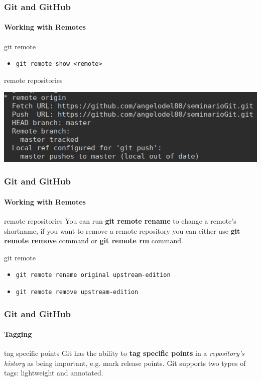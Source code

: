\begin{frame}
	\frametitle{Git and GitHub}
    \framesubtitle{Working with Remotes}
    \addtocounter{nframe}{1}


	\begin{block}{git remote}
		\begin{itemize}
			\item \texttt{git remote show <remote>}
		\end{itemize}
	\end{block}


	\begin{block}{remote repositories}
		\begin{center}
			\includegraphics[width=.9\textwidth]{imgs/git-remote-show}
		\end{center}
	\end{block}

\end{frame}

\begin{frame}
	\frametitle{Git and GitHub}
    \framesubtitle{Working with Remotes}
    \addtocounter{nframe}{1}

	\begin{block}{remote repositories}
		You can run \textbf{git remote rename} to change a remote’s shortname, if you want to remove a remote repository you can either use \textbf{git remote remove} command or \textbf{git remote rm} command. 

	\end{block}

	\begin{block}{git remote}
		\begin{itemize}
			\item \texttt{git remote rename original upstream-edition}
			\item \texttt{git remote remove upstream-edition}
		\end{itemize}
	\end{block}

\end{frame}

\begin{frame}
	\frametitle{Git and GitHub}
    \framesubtitle{Tagging}
    \addtocounter{nframe}{1}

	\begin{block}{tag specific points}
		Git has the ability to \textbf{tag specific points} in a \textit{repository's history} as being important, e.g. mark release points. Git supports two types of tags: lightweight and annotated.
	\end{block}

\end{frame}

